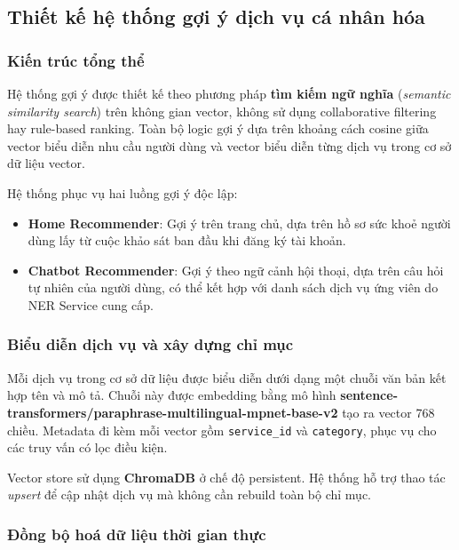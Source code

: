 
\subsection{Thiết kế hệ thống gợi ý dịch vụ cá nhân hóa}

\subsubsection{Kiến trúc tổng thể}

Hệ thống gợi ý được thiết kế theo phương pháp \textbf{tìm kiếm ngữ nghĩa} (\textit{semantic similarity search}) trên không gian vector, không sử dụng collaborative filtering hay rule-based ranking. Toàn bộ logic gợi ý dựa trên khoảng cách cosine giữa vector biểu diễn nhu cầu người dùng và vector biểu diễn từng dịch vụ trong cơ sở dữ liệu vector.

Hệ thống phục vụ hai luồng gợi ý độc lập:

\begin{itemize}
    \item \textbf{Home Recommender}: Gợi ý trên trang chủ, dựa trên hồ sơ sức khoẻ người dùng lấy từ cuộc khảo sát ban đầu khi đăng ký tài khoản.
    \item \textbf{Chatbot Recommender}: Gợi ý theo ngữ cảnh hội thoại, dựa trên câu hỏi tự nhiên của người dùng, có thể kết hợp với danh sách dịch vụ ứng viên do NER Service cung cấp.
\end{itemize}

\subsubsection{Biểu diễn dịch vụ và xây dựng chỉ mục}

Mỗi dịch vụ trong cơ sở dữ liệu được biểu diễn dưới dạng một chuỗi văn bản kết hợp tên và mô tả. Chuỗi này được embedding bằng mô hình \textbf{sentence-transformers/paraphrase-multilingual-mpnet-base-v2} tạo ra vector 768 chiều. Metadata đi kèm mỗi vector gồm \texttt{service\_id} và \texttt{category}, phục vụ cho các truy vấn có lọc điều kiện.

Vector store sử dụng \textbf{ChromaDB} ở chế độ persistent. Hệ thống hỗ trợ thao tác \textit{upsert} để cập nhật dịch vụ mà không cần rebuild toàn bộ chỉ mục.

\subsubsection{Đồng bộ hoá dữ liệu thời gian thực}

